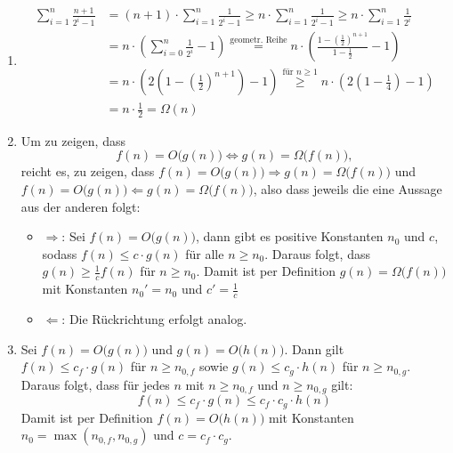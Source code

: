 \documentclass[11pt,a4paper]{article}
\begin{document}
\begin{loesung}
\begin{enumerate}
    \item
    \begin{align}
        \sum\limits_{i=1}^{n} \frac{n + 1}{2^i - 1} &= (n+1)\cdot\sum\limits_{i=1}^{n} \frac{1}{2^i - 1} \geq
        n\cdot\sum\limits_{i=1}^{n} \frac{1}{2^i - 1} 
        \geq n \cdot \sum\limits_{i=1}^{n} \frac{1}{2^i} \\
        &= n \cdot \left(\sum\limits_{i=0}^{n} \frac{1}{2^i} - 1\right)
        \overset{\text{geometr. Reihe}}{=}
        n \cdot  \left(\frac{1 - \left(\frac{1}{2}\right)^{n+1}}{1 - \frac{1}{2}} - 1\right) \\
        &=n \cdot  \left(2\left(1 - \left(\frac{1}{2}\right)^{n + 1}\right) - 1\right)
        \overset{\text{für }n \geq 1}{\geq} n \cdot  \left(2 \left(1 - \frac{1}{4}\right) - 1\right) \\
        &= n \cdot \frac{1}{2}= \Omega(n)
    \end{align}

    \item
    Um zu zeigen, dass 
    \begin{equation}
     f(n) = O\big(g(n)\big) \Leftrightarrow g(n) = \Omega\big(f(n)\big),
    \end{equation}
    reicht es, zu zeigen, dass $f(n) = O\big(g(n)\big) \Rightarrow g(n) = \Omega\big(f(n)\big)$ und $f(n) = O\big(g(n)\big) \Leftarrow g(n) = \Omega\big(f(n)\big)$, also dass jeweils die eine Aussage aus der anderen folgt:
    \begin{itemize}
        \item $\Rightarrow$: Sei $f(n) = O\big(g(n)\big)$, dann gibt es positive Konstanten $n_0$ und $ c$, sodass $f(n) \leq c \cdot g(n)$ für alle $n \geq n_0$.
        Daraus folgt, dass $g(n) \geq \frac{1}{c} f(n)$ für $n \geq n_0$.
        Damit ist per Definition $g(n) = \Omega\big(f(n)\big)$ mit Konstanten $n_0' = n_0$ und $c' = \frac{1}{c}$
        \item $\Leftarrow$: Die Rückrichtung erfolgt analog.
    \end{itemize}

    \item
    Sei $f(n) = O\big(g(n)\big)$ und $g(n) = O\big(h(n)\big)$.
    Dann gilt $f(n) \leq c_f \cdot g(n)$ für $n \geq n_{0,f}$ sowie $g(n) \leq c_g \cdot h(n)$ für $n \geq n_{0,g}$.
    Daraus folgt, dass für jedes $n$ mit $n \geq n_{0,f}$ und $n \geq n_{0,g}$ gilt:
    \begin{equation}
        f(n) \leq c_f \cdot g(n) \leq c_f \cdot c_g \cdot h(n)
    \end{equation}
    Damit ist per Definition $f(n) = O\big(h(n)\big)$ mit Konstanten $n_0 = \max(n_{0,f}, n_{0,g})$ und $c = c_f \cdot c_g$.

    


\end{enumerate}
\end{loesung}
\end{document}
